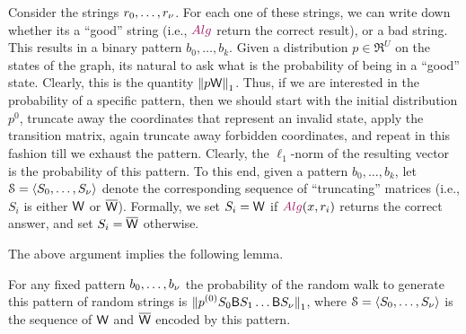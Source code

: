 Consider the strings $r_0, \ldots, r_\nu$. For each one of these
strings, we can write down whether its a ``good'' string (i.e., $\Alg$
return the correct result), or a bad string. This results in a binary
pattern $b_0, \ldots, b_k$. Given a distribution $p \in \Re^U$ on the
states of the graph, its natural to ask what is the probability of
being in a ``good'' state. Clearly, this is the quantity $\left\| {p
   \mathsf{W}} \right\|_1$. Thus, if we are interested in the probability of a
specific pattern, then we should start with the initial distribution
$p^{0}$, truncate away the coordinates that represent an invalid
state, apply the transition matrix, again truncate away forbidden
coordinates, and repeat in this fashion till we exhaust the
pattern. Clearly, the $\ell_1$-norm of the resulting vector is the
probability of this pattern. To this end, given a pattern $b_0,\ldots,
b_k$, let $\EuScript{S} = \left\langle {S_0, \ldots, S_\nu} \right\rangle$ denote the
corresponding sequence of ``truncating'' matrices (i.e., $S_i$ is
either $\mathsf{W}$ or $\overline{\mathsf{W}}$). Formally, we set $S_i=\mathsf{W}$ if
$\Alg(x, r_i)$ returns the correct answer, and set $S_i = \overline{\mathsf{W}}$
otherwise.

The above argument implies the following lemma.

\begin{lemma}
    For any fixed pattern $b_0, \ldots, b_\nu$ the probability of
    the random walk to generate this pattern of random strings is
    $\displaystyle \left\| {\smash{p^{(0)} S_0 \mathsf{B} S_1 \ldots \mathsf{B}
          S_\nu}} \right\|_1$, where
    $\EuScript{S} = \left\langle {S_0, \ldots, S_\nu} \right\rangle$ is the sequence of
    $\mathsf{W}$ and $\overline{\mathsf{W}}$ encoded by this pattern.
\end{lemma}


